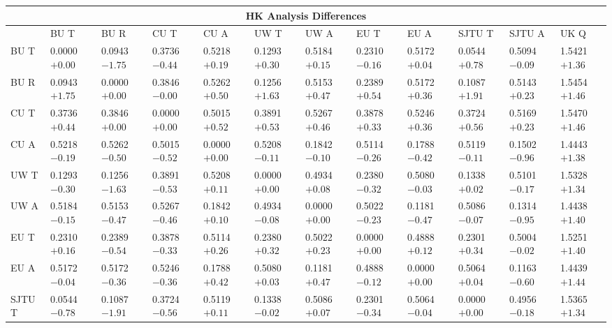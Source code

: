 \begin{landscape}
\begin{table}
\small
\centering
\renewcommand{\arraystretch}{1.5}
\begin{tabularx}{1\linewidth}{@{\extracolsep{\fill}}lXXXXXXXXXXX}
  \toprule
  	\multicolumn{12}{c}{{\normalsize HK Analysis Differences}} \\
  \midrule
  	       & BU T & BU R & CU T & CU A & UW T & UW A & EU T & EU A & SJTU T & SJTU A & UK Q \\
  \midrule
	BU T   & 0.0000 $+0.00$ & 0.0943 $-1.75$ & 0.3736 $-0.44$ & 0.5218 $+0.19$ & 0.1293 $+0.30$ & 0.5184 $+0.15$ & 0.2310 $-0.16$ & 0.5172 $+0.04$ & 0.0544 $+0.78$ & 0.5094 $-0.09$ & 1.5421 $+1.36$  \\
	BU R   & 0.0943 $+1.75$ & 0.0000 $+0.00$ & 0.3846 $-0.00$ & 0.5262 $+0.50$ & 0.1256 $+1.63$ & 0.5153 $+0.47$ & 0.2389 $+0.54$ & 0.5172 $+0.36$ & 0.1087 $+1.91$ & 0.5143 $+0.23$ & 1.5454 $+1.46$  \\
	CU T   & 0.3736 $+0.44$ & 0.3846 $+0.00$ & 0.0000 $+0.00$ & 0.5015 $+0.52$ & 0.3891 $+0.53$ & 0.5267 $+0.46$ & 0.3878 $+0.33$ & 0.5246 $+0.36$ & 0.3724 $+0.56$ & 0.5169 $+0.23$ & 1.5470 $+1.46$  \\
	CU A   & 0.5218 $-0.19$ & 0.5262 $-0.50$ & 0.5015 $-0.52$ & 0.0000 $+0.00$ & 0.5208 $-0.11$ & 0.1842 $-0.10$ & 0.5114 $-0.26$ & 0.1788 $-0.42$ & 0.5119 $-0.11$ & 0.1502 $-0.96$ & 1.4443 $+1.38$  \\
	UW T   & 0.1293 $-0.30$ & 0.1256 $-1.63$ & 0.3891 $-0.53$ & 0.5208 $+0.11$ & 0.0000 $+0.00$ & 0.4934 $+0.08$ & 0.2380 $-0.32$ & 0.5080 $-0.03$ & 0.1338 $+0.02$ & 0.5101 $-0.17$ & 1.5328 $+1.34$  \\
	UW A   & 0.5184 $-0.15$ & 0.5153 $-0.47$ & 0.5267 $-0.46$ & 0.1842 $+0.10$ & 0.4934 $-0.08$ & 0.0000 $+0.00$ & 0.5022 $-0.23$ & 0.1181 $-0.47$ & 0.5086 $-0.07$ & 0.1314 $-0.95$ & 1.4438 $+1.40$  \\
	EU T   & 0.2310 $+0.16$ & 0.2389 $-0.54$ & 0.3878 $-0.33$ & 0.5114 $+0.26$ & 0.2380 $+0.32$ & 0.5022 $+0.23$ & 0.0000 $+0.00$ & 0.4888 $+0.12$ & 0.2301 $+0.34$ & 0.5004 $-0.02$ & 1.5251 $+1.40$  \\
	EU A   & 0.5172 $-0.04$ & 0.5172 $-0.36$ & 0.5246 $-0.36$ & 0.1788 $+0.42$ & 0.5080 $+0.03$ & 0.1181 $+0.47$ & 0.4888 $-0.12$ & 0.0000 $+0.00$ & 0.5064 $+0.04$ & 0.1163 $-0.60$ & 1.4439 $+1.44$  \\
	SJTU T & 0.0544 $-0.78$ & 0.1087 $-1.91$ & 0.3724 $-0.56$ & 0.5119 $+0.11$ & 0.1338 $-0.02$ & 0.5086 $+0.07$ & 0.2301 $-0.34$ & 0.5064 $-0.04$ & 0.0000 $+0.00$ & 0.4956 $-0.18$ & 1.5365 $+1.34$  \\

\end{tabularx}
\end{table}
\end{landscape}
